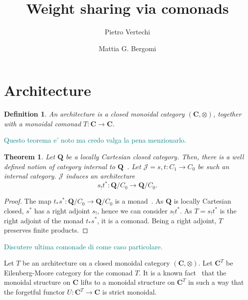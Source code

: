 \documentclass[12pt]{article}
\title{Weight sharing via comonads}
\author{
    Pietro Vertechi \and Mattia G. Bergomi
}
\date{}
\newtheorem{theorem}{Theorem}
\newtheorem{definition}{Definition}
\newcommand{\pietro}[1]{\textcolor{teal}{#1}}
\newcommand{\Cat}{{\mathbf{C}}}
\newcommand{\JCat}{{\mathcal{J}}}
\newcommand{\QCat}{{\mathbf{Q}}}
\begin{document}
\maketitle
\begin{abstract}
\end{abstract}

\section{Architecture}

\begin{definition}\label{def:architecture}
    An {\em architecture} is a closed monoidal category $(\Cat, \otimes)$, together with a monoidal comonad $T\colon \Cat \rightarrow \Cat$.
\end{definition}

\pietro{Questo teorema e' noto ma credo valga la pena menzionarlo.}

\begin{theorem}\label{thm:categorical_architecture}
    Let $\QCat$ be a locally Cartesian closed category. Then, there is a well defined notion of category {\em internal} to $\QCat$~\cite{mac2013categories}.
    Let $\JCat = s, t \colon C_1 \rightarrow C_0$ be such an internal category. $\JCat$ induces an architecture
    \begin{equation*}
        s_!t^*\colon \QCat/C_0 \rightarrow \QCat/C_0.
    \end{equation*}
\end{theorem}

\begin{proof}
    The map $t_*s^*\colon \QCat/C_0 \rightarrow \QCat/C_0$ is a monad~\cite[Thm.~V.8.2]{Mac_Lane_1994}. As $\QCat$ is locally Cartesian closed, $s^*$ has a right adjoint $s_!$, hence we can consider $s_!t^*$. As $T = s_!t^*$ is the right adjoint of the monad $t_*s^*$, it is a comonad. Being a right adjoint, $T$ preserves finite products.
\end{proof}

\pietro{Discutere ultima comonade di \cite{uustalu_comonadic_2008} come caso particolare.}

Let $T$ be an architecture on a closed monoidal category $(\Cat, \otimes)$. Let $\Cat^T$ be Eilenberg-Moore category for the comonad $T$. It is a known fact~\cite{Moerdijk_2002,pastro2009closed} that the monoidal structure on $\Cat$ lifts to a monoidal structure on $\Cat^T$ in such a way that the forgetful functor $U\colon \Cat^T \rightarrow \Cat$ is strict monoidal.
\end{document}

